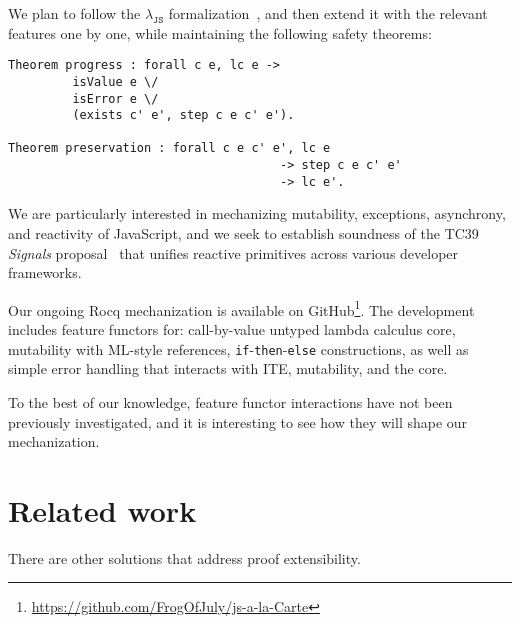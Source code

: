 \documentclass[sigplan,nonacm,review]{acmart}
\begin{document}


We plan to follow the $\lambda_{\texttt{JS}}$ formalization~\cite{guha2010essence},
and then extend it with the relevant features one by one,
while maintaining the following safety theorems:

\begin{lstlisting}[numbers=none, language=Coq]
Theorem progress : forall c e, lc e -> 
         isValue e \/ 
         isError e \/ 
         (exists c' e', step c e c' e').

Theorem preservation : forall c e c' e', lc e
                                      -> step c e c' e'
                                      -> lc e'.
\end{lstlisting}

We are particularly interested in mechanizing
mutability, exceptions, asynchrony, and reactivity of JavaScript, and we seek to establish soundness of the TC39 \emph{Signals} proposal~\cite{signals-proposal-t39} that unifies reactive primitives across various developer frameworks. 



Our ongoing Rocq mechanization is available on
GitHub\footnote{\url{https://github.com/FrogOfJuly/js-a-la-Carte}}. 
The development includes feature functors for: call-by-value untyped lambda calculus core, mutability with ML-style references, \texttt{if}-\texttt{then}-\texttt{else} constructions, as well as simple error handling that interacts with ITE, mutability, and the core.

To the best of our knowledge, feature functor interactions have not been previously investigated, and it is interesting to see how they will shape our mechanization.

\section{Related work}

There are other solutions that address proof extensibility. 

\end{document}
